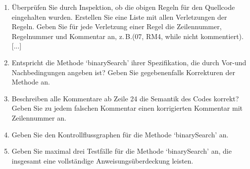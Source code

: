 \documentclass{lehramt-informatik-minimal}
\begin{document}
\begin{enumerate}
\item Überprüfen Sie durch Inspektion, ob die obigen Regeln für den
Quellcode eingehalten wurden. Erstellen Sie eine Liste mit allen
Verletzungen der Regeln. Geben Sie für jede Verletzung einer Regel die
Zeilennummer, Regelnummer und Kommentar an, z.\,B.(07, RM4, while nicht
kommentiert).[...]

\item Entspricht die Methode ‘binarySearch’ ihrer Spezifikation, die
durch Vor-und Nachbedingungen angeben ist? Geben Sie gegebenenfalls
Korrekturen der Methode an.

\item Beschreiben alle Kommentare ab Zeile 24 die Semantik des Codes
korrekt? Geben Sie zu jedem falschen Kommentar einen korrigierten
Kommentar mit Zeilennummer an.

\item Geben Sie den Kontrollflussgraphen für die Methode ‘binarySearch’
an.

\item Geben Sie maximal drei Testfälle für die Methode ‘binarySearch’
an, die insgesamt eine vollständige Anweisungsüberdeckung leisten.


\end{enumerate}
\end{document}
